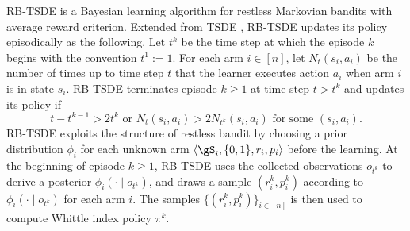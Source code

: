 RB-TSDE is a Bayesian learning algorithm for restless Markovian bandits with average reward criterion.
Extended from TSDE \cite{ouyang2017learning}, RB-TSDE updates its policy episodically as the following.
Let $t^k$ be the time step at which the episode $k$ begins with the convention $t^1:=1$.
For each arm $i\in[n]$, let $N_t(s_i,a_i)$ be the number of times up to time step $t$ that the learner executes action $a_i$ when arm $i$ is in state $s_i$.
RB-TSDE terminates episode $k\ge1$ at time step $t> t^k$ and updates its policy if
\begin{equation}
    \label{ch:restless:eq:update_crit}
    t-t^{k-1}>2t^k \text{ or } N_t(s_i,a_i) > 2N_{t^k}(s_i,a_i) \text{ for some }(s_i,a_i).
\end{equation}
RB-TSDE \cite{akbarzadeh2022learning} exploits the structure of restless bandit by choosing a prior distribution $\phi_i$ for each unknown arm $\langle\gS_i, \{0,1\}, r_i, p_i\rangle$ before the learning.
At the beginning of episode $k\ge1$, RB-TSDE uses the collected observations $o_{t^k}$ to derive a posterior $\phi_i(\cdot\mid o_{t^k})$, and draws a sample $(r^k_i,p^k_i)$ according to $\phi_i(\cdot\mid o_{t^k})$ for each arm $i$.
The samples $\{(r^k_i,p^k_i)\}_{i\in[n]}$ is then used to compute Whittle index policy $\pi^k$.

